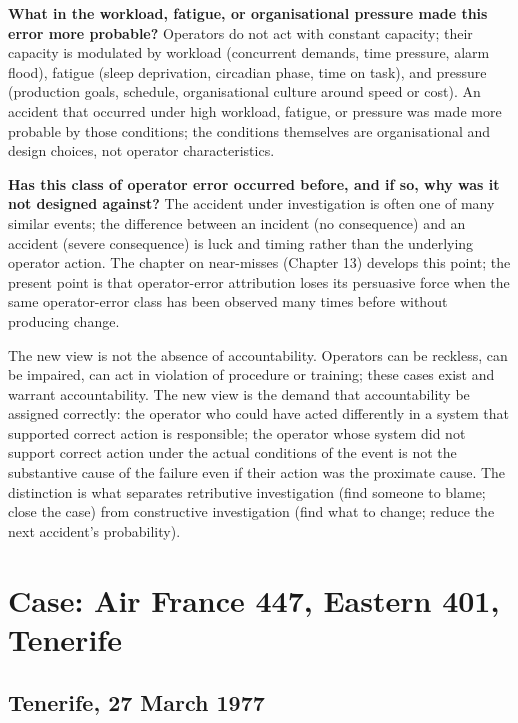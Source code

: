 \textbf{What in the workload, fatigue, or organisational pressure made this error more probable?} Operators do not act with constant capacity; their capacity is modulated by workload (concurrent demands, time pressure, alarm flood), fatigue (sleep deprivation, circadian phase, time on task), and pressure (production goals, schedule, organisational culture around speed or cost). An accident that occurred under high workload, fatigue, or pressure was made more probable by those conditions; the conditions themselves are organisational and design choices, not operator characteristics.

\textbf{Has this class of operator error occurred before, and if so, why was it not designed against?} The accident under investigation is often one of many similar events; the difference between an incident (no consequence) and an accident (severe consequence) is luck and timing rather than the underlying operator action. The chapter on near-misses (Chapter 13) develops this point; the present point is that operator-error attribution loses its persuasive force when the same operator-error class has been observed many times before without producing change.

The new view is not the absence of accountability. Operators can be reckless, can be impaired, can act in violation of procedure or training; these cases exist and warrant accountability. The new view is the demand that accountability be assigned correctly: the operator who could have acted differently in a system that supported correct action is responsible; the operator whose system did not support correct action under the actual conditions of the event is not the substantive cause of the failure even if their action was the proximate cause. The distinction is what separates retributive investigation (find someone to blame; close the case) from constructive investigation (find what to change; reduce the next accident's probability).

\section{Case: Air France 447, Eastern 401, Tenerife}

\subsection*{Tenerife, 27 March 1977}

